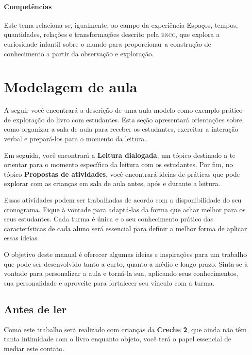 \documentclass[11pt]{extarticle}
\begin{document}
\paragraph{Competências} Este tema relaciona-se, igualmente, ao 
campo da experiência Espaços, tempos, quantidades, relações e transformações 
descrito pela \textsc{bncc}, que explora a curiosidade infantil sobre o mundo 
para proporcionar a construção de conhecimento a partir da observação e exploração. 


\section{Modelagem de aula}
A seguir você encontrará a descrição de uma aula modelo como exemplo 
prático de exploração do livro com estudantes. Esta seção apresentará 
orientações sobre como organizar a sala de aula para receber os 
estudantes, exercitar a interação verbal e prepará-los para o 
momento da leitura.

Em seguida, você encontrará a \textbf{Leitura dialogada}, um 
tópico destinado a te orientar para o momento específico da 
leitura com os estudantes. Por fim, no tópico 
\textbf{Propostas de atividades}, você encontrará ideias 
de práticas que pode explorar com as crianças em sala de 
aula antes, após e durante a leitura. 

Essas atividades podem ser trabalhadas de acordo com a 
disponibilidade do seu cronograma. Fique à vontade para adaptá-las 
da forma que achar melhor para os seus estudantes. Cada turma é única 
e o seu conhecimento prático das características de cada aluno será 
essencial para definir a melhor forma de aplicar essas ideias. 

O objetivo deste manual é oferecer algumas ideias 
e inspirações para um trabalho que pode ser desenvolvido tanto 
a curto, quanto a médio e longo prazo. Sinta-se à vontade para 
personalizar a aula e torná-la sua, aplicando seus conhecimentos, sua 
personalidade e aproveite para fortalecer 
seu vínculo com a turma.


\subsection{Antes de ler}


Como este trabalho será realizado com crianças da \textbf{Creche 2}, 
que ainda não têm tanta intimidade com o livro enquanto objeto, você terá o 
papel essencial de mediar este contato. 
\end{document}

